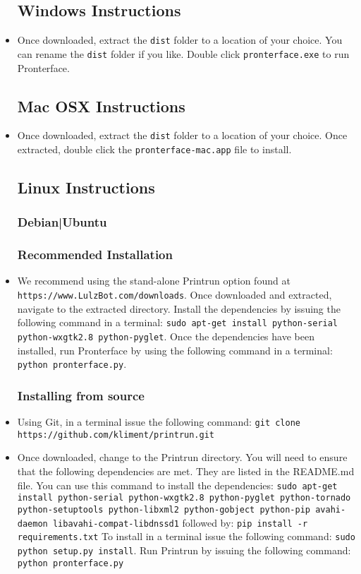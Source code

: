 \begin{itemize}
\subsection{Windows Instructions}
\item Once downloaded, extract the \texttt{dist} folder to a location of your choice. You can rename the \texttt{dist} folder if you like. Double click \texttt{pronterface.exe} to run Pronterface.


\subsection{Mac OSX Instructions}
\item Once downloaded, extract the \texttt{dist} folder to a location of your choice. Once extracted, double click the \texttt{pronterface-mac.app} file to install.

\subsection{Linux Instructions}
\subsubsection{Debian|Ubuntu}
\subsubsection{Recommended Installation}
\item We recommend using the stand-alone Printrun option found at \texttt{https://www.LulzBot.com/downloads}. Once downloaded and extracted, navigate to the extracted directory. Install the dependencies by issuing the following command in a terminal: \texttt{sudo apt-get install python-serial python-wxgtk2.8 python-pyglet}. Once the dependencies have been installed, run Pronterface by using the following command in a terminal: \texttt{python pronterface.py}.

\subsubsection{Installing from source}
\item Using Git, in a terminal issue the following command: \texttt{git clone https://github.com/kliment/printrun.git}
\item Once downloaded, change to the Printrun directory. You will need to ensure that the following dependencies are met. They are listed in the README.md file. You can use this command to install the dependencies:
\texttt{sudo apt-get install python-serial python-wxgtk2.8 python-pyglet python-tornado python-setuptools python-libxml2 python-gobject python-pip avahi-daemon libavahi-compat-libdnssd1}
followed by:
\texttt{pip install -r requirements.txt}
To install in a terminal issue the following command:
\texttt{sudo python setup.py install}.
Run Printrun by issuing the following command:
\texttt{python pronterface.py}


\end{itemize}
